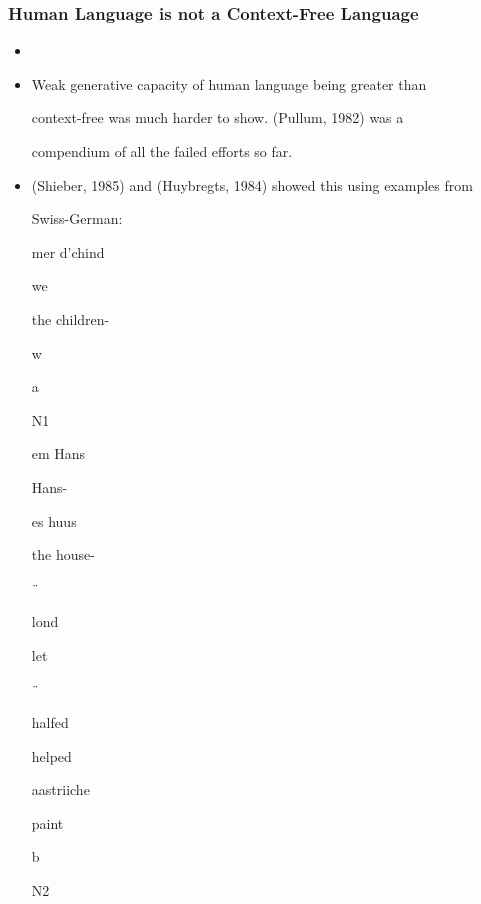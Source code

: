 \documentclass[compress,color=usenames]{beamer}
\begin{document}
\begin{frame}
\frametitle{Human Language is not a Context-Free Language}

\begin{itemize}
\item




\item Weak generative capacity of human language being greater than


context-free was much harder to show. (Pullum, 1982) was a


compendium of all the failed efforts so far.





\item (Shieber, 1985) and (Huybregts, 1984) showed this using examples from


Swiss-German:


mer d'chind


we


the children-





w





a


N1





em Hans


Hans-





es huus


the house-





¨


lond


let





¨


halfed


helped





aastriiche


paint





b


N2






\end{itemize}
\end{frame}
\end{document}
